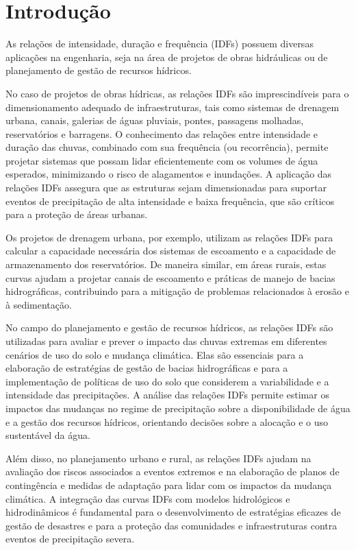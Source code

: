 \documentclass[
]{agujournal2019}
\begin{document}
\section{Introdução}\label{introduuxe7uxe3o}

\justifying

As relações de intensidade, duração e frequência (IDFs) possuem diversas
aplicações na engenharia, seja na área de projetos de obras hidráulicas
ou de planejamento de gestão de recursos hídricos.

No caso de projetos de obras hídricas, as relações IDFs são
imprescindíveis para o dimensionamento adequado de infraestruturas, tais
como sistemas de drenagem urbana, canais, galerias de águas pluviais,
pontes, passagens molhadas, reservatórios e barragens. O conhecimento
das relações entre intensidade e duração das chuvas, combinado com sua
frequência (ou recorrência), permite projetar sistemas que possam lidar
eficientemente com os volumes de água esperados, minimizando o risco de
alagamentos e inundações. A aplicação das relações IDFs assegura que as
estruturas sejam dimensionadas para suportar eventos de precipitação de
alta intensidade e baixa frequência, que são críticos para a proteção de
áreas urbanas.

Os projetos de drenagem urbana, por exemplo, utilizam as relações IDFs
para calcular a capacidade necessária dos sistemas de escoamento e a
capacidade de armazenamento dos reservatórios. De maneira similar, em
áreas rurais, estas curvas ajudam a projetar canais de escoamento e
práticas de manejo de bacias hidrográficas, contribuindo para a
mitigação de problemas relacionados à erosão e à sedimentação.

No campo do planejamento e gestão de recursos hídricos, as relações IDFs
são utilizadas para avaliar e prever o impacto das chuvas extremas em
diferentes cenários de uso do solo e mudança climática. Elas são
essenciais para a elaboração de estratégias de gestão de bacias
hidrográficas e para a implementação de políticas de uso do solo que
considerem a variabilidade e a intensidade das precipitações. A análise
das relações IDFs permite estimar os impactos das mudanças no regime de
precipitação sobre a disponibilidade de água e a gestão dos recursos
hídricos, orientando decisões sobre a alocação e o uso sustentável da
água.

Além disso, no planejamento urbano e rural, as relações IDFs ajudam na
avaliação dos riscos associados a eventos extremos e na elaboração de
planos de contingência e medidas de adaptação para lidar com os impactos
da mudança climática. A integração das curvas IDFs com modelos
hidrológicos e hidrodinâmicos é fundamental para o desenvolvimento de
estratégias eficazes de gestão de desastres e para a proteção das
comunidades e infraestruturas contra eventos de precipitação severa.
\end{document}
